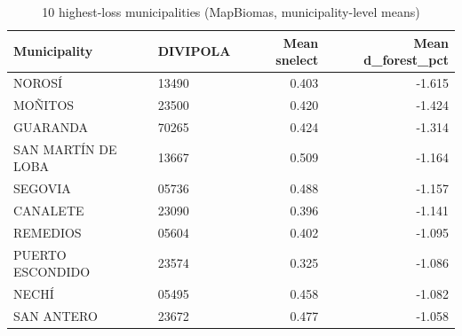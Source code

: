 \begin{table}

\caption{10 highest-loss municipalities (MapBiomas, municipality-level means)}
\centering
\begin{tabular}[t]{llrr}
\toprule
Municipality & DIVIPOLA & Mean snelect & Mean d\_forest\_pct\\
\midrule
NOROSÍ & 13490 & 0.403 & -1.615\\
MOÑITOS & 23500 & 0.420 & -1.424\\
GUARANDA & 70265 & 0.424 & -1.314\\
SAN MARTÍN DE LOBA & 13667 & 0.509 & -1.164\\
SEGOVIA & 05736 & 0.488 & -1.157\\
\addlinespace
CANALETE & 23090 & 0.396 & -1.141\\
REMEDIOS & 05604 & 0.402 & -1.095\\
PUERTO ESCONDIDO & 23574 & 0.325 & -1.086\\
NECHÍ & 05495 & 0.458 & -1.082\\
SAN ANTERO & 23672 & 0.477 & -1.058\\
\bottomrule
\end{tabular}
\end{table}
